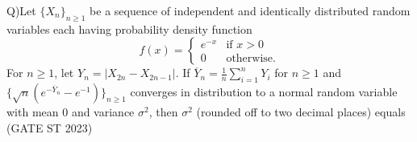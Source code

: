 \documentclass[journal,12pt,twocolumn]{IEEEtran}
\begin{document}
Q)Let $\{X_n\}_{n \geq 1}$ be a sequence of independent and identically distributed random variables each having probability density function
\[
f(x) = 
\begin{cases}
  e^{-x} & \text{if } x > 0 \\
  0 & \text{otherwise}.
\end{cases}
\]
For $n \geq 1$, let $Y_n = |X_{2n} - X_{2n-1}|$. If $\overline{Y}_n = \frac{1}{n} \sum_{i=1}^{n} Y_i$ for $n \geq 1$ and $\{\sqrt{n} (e^{-\overline{Y}_n} - e^{-1})\}_{n \geq 1}$ converges in distribution to a normal random variable with mean $0$ and variance $\sigma^2$, then $\sigma^2$ (rounded off to two decimal places) equals \hfill (GATE ST 2023) \\
   \solution
\end{document}
